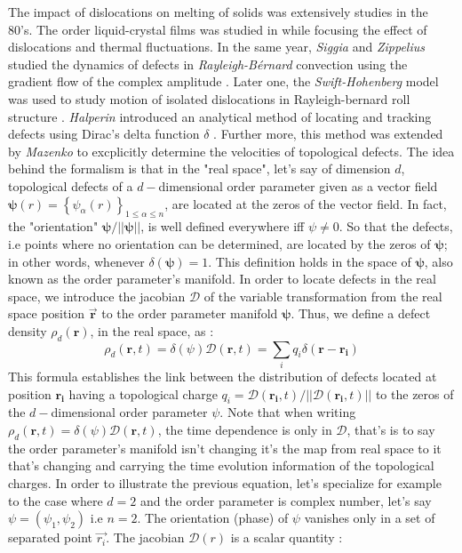 \documentclass[11pt]{article}
\begin{document}
The impact of dislocations on melting of solids was extensively studies in the 80's. The order liquid-crystal films was studied in \parencite{tonerSmecticcholesteric1981} \parencite{nelsonBondorientationalorder1981} while focusing the effect of dislocations and thermal fluctuations. In the same year, \emph{Siggia} and \emph{Zippelius} studied the dynamics of defects in \emph{Rayleigh-Bérnard} convection using the gradient flow of the complex amplitude \parencite{siggiaDynamicsdefects1981}. Later one, the \emph{Swift-Hohenberg} model was used to study motion of isolated dislocations in Rayleigh-bernard roll structure \parencite{shiwaDislocationmotion1986}. \emph{Halperin} introduced an analytical method of locating and tracking defects using Dirac's delta function $\delta$ \parencite{Halperin1981}. Further more,  this method was extended by \emph{Mazenko} \parencite{mazenkoOrderingkinetics1998a} to excplicitly determine the velocities of topological defects. The idea behind the formalism is that in the "real space", let's say of dimension $d$, topological defects of a $d-$dimensional order parameter given as a vector field $\bm\psi(r)=\left\lbrace \psi_\alpha(r)\right\rbrace_{1\leq\alpha\leq n}$, are located at the zeros of the vector field. In fact, the "orientation" $\bm \psi / ||\bm \psi||$, is well defined everywhere iff $\psi \neq 0$. So that the defects, i.e points where no orientation can be determined, are located by the zeros of $\bm \psi$; in other words, whenever $\delta(\bm \psi) =1$. This definition holds in the space of $\bm \psi$, also known as the order parameter's manifold. In order to locate defects in the real space, we introduce the jacobian $\mathcal{D}$ of the variable transformation from the real space position $\vec{\bm r}$ to the order parameter manifold $\bm \psi$. Thus, we define a defect density $\rho_d(\bm r)$\parencite{Halperin1981}, in the real space, as :
\begin{equation}
    \rho_d(\bm r,t) = \delta(\psi) \mathcal{D}(\bm r,t)=\sum_i q_i \delta(\bm r -\bm{r_i})
\end{equation}
This formula establishes the link between the distribution of defects located at position $\bm{r_i}$ having a topological charge $q_i = \mathcal{D}(\bm{r_i},t)/||\mathcal{D}(\bm{r_i},t)||$ to the zeros of the $d-$dimensional order parameter $\psi$. Note that when  writing $\rho_d(\bm r,t) = \delta(\psi) \mathcal{D}(\bm r,t)$, the time dependence is only in $\mathcal{D}$, that's is to say the order parameter's manifold isn't changing it's the map from real space to it that's changing and carrying the time evolution information of the topological charges. In order to illustrate the previous equation, let's specialize for example to the case where $d=2$ and the order parameter is complex number, let's say $\psi = (\psi_1,\psi_2)$ i.e $n=2$. The orientation (phase) of $\psi$ vanishes only in a set of separated point $\vec{r_i}$. The jacobian $\mathcal{D}(r)$ is a scalar quantity \parencite{anghelutaAnisotropicvelocity2012}:
\end{document}
